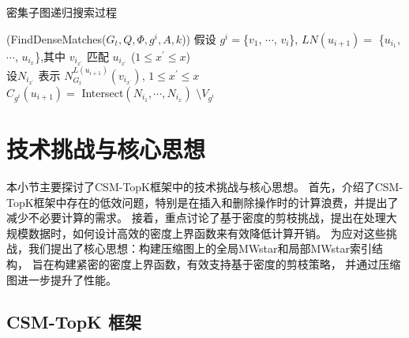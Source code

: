 \begin{algorithm}[h!]
	\small
	\caption{密集子图递归搜索过程}
	\label{alg:find-dense-matches}
	\iFunc(FindDenseMatches{(}$G_t, Q, \Phi, g^i, A, k${)})
	{
		假设 $g^{i}=$\{$v_{1}$, $\cdots$, $v_{i}$\}, $LN(u_{i+1})=$ \{$u_{i_1}$, $\cdots$, $u_{i_x}$\},其中 $v_{i_{x^\prime}}$ 匹配 $u_{i_{x^\prime}}$ ($1\leq x^\prime\leq x$)  \label{code:base-extension:begin} \\
		设$N_{i_{x^\prime}}$ 表示 $N_{G_t}^{L(u_{i+1})}(v_{i_{x^\prime}})$, $1\leq x^\prime\leq x$  \label{code:base-intersect:start} \\
		$C_{g^i}(u_{i+1})= $ Intersect$(N_{i_1}, \cdots, N_{i_x})$ $\setminus V_{g^i}$  \label{code:intersect}  \label{code:base-intersect:end}\\
		\Return 
	}
\end{algorithm}	

\section{技术挑战与核心思想}
本小节主要探讨了CSM-TopK框架中的技术挑战与核心思想。
首先，介绍了CSM-TopK框架中存在的低效问题，特别是在插入和删除操作时的计算浪费，并提出了减少不必要计算的需求。
接着，重点讨论了基于密度的剪枝挑战，提出在处理大规模数据时，如何设计高效的密度上界函数来有效降低计算开销。
为应对这些挑战，我们提出了核心思想：构建压缩图上的全局MWstar和局部MWstar索引结构，  旨在构建紧密的密度上界函数，有效支持基于密度的剪枝策略，
并通过压缩图进一步提升了性能。
\subsection{CSM-TopK 框架}


